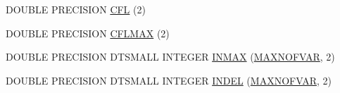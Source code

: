 \begin{DoxyCompactItemize}
D\-O\-U\-B\-L\-E P\-R\-E\-C\-I\-S\-I\-O\-N \hyperlink{home_2abonfi_2_c_f_d__codes_2_eul_f_s_83_84_2include_2conv_8com_a13e33219ad81cfe3676bf98de68625b4}{C\-F\-L} (2)
\item 
D\-O\-U\-B\-L\-E P\-R\-E\-C\-I\-S\-I\-O\-N \hyperlink{home_2abonfi_2_c_f_d__codes_2_eul_f_s_83_84_2include_2conv_8com_ac6938ff34c279daaa8c7af56cd95f9cf}{C\-F\-L\-M\-A\-X} (2)
\item 
D\-O\-U\-B\-L\-E P\-R\-E\-C\-I\-S\-I\-O\-N D\-T\-S\-M\-A\-L\-L I\-N\-T\-E\-G\-E\-R \hyperlink{home_2abonfi_2_c_f_d__codes_2_eul_f_s_83_84_2include_2conv_8com_a281aba02624028804313692bfd933597}{I\-N\-M\-A\-X} (\hyperlink{msa20_2home_2abonfi_2_c_f_d__codes_2_eul_f_s_83_82_83_2include_2paramt_8h_ae08fa28f58a75033834af08d1f9359ce}{M\-A\-X\-N\-O\-F\-V\-A\-R}, 2)
\item 
D\-O\-U\-B\-L\-E P\-R\-E\-C\-I\-S\-I\-O\-N D\-T\-S\-M\-A\-L\-L I\-N\-T\-E\-G\-E\-R \hyperlink{home_2abonfi_2_c_f_d__codes_2_eul_f_s_83_84_2include_2conv_8com_a268cd66fa54c868e3470a5082cbb9f4f}{I\-N\-D\-E\-L} (\hyperlink{msa20_2home_2abonfi_2_c_f_d__codes_2_eul_f_s_83_82_83_2include_2paramt_8h_ae08fa28f58a75033834af08d1f9359ce}{M\-A\-X\-N\-O\-F\-V\-A\-R}, 2)
\end{DoxyCompactItemize}

